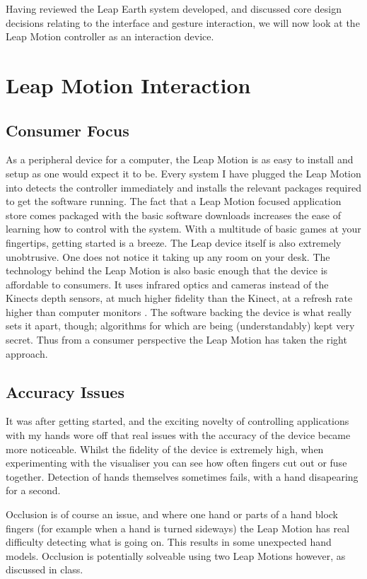 \documentclass{sigplanconf}
\begin{document}
Having reviewed the Leap Earth system developed, and discussed core design decisions relating to the interface and gesture interaction, we will now look at the Leap Motion controller as an interaction device.


\section{Leap Motion Interaction} 
\label{sec:leap_interaction}

\subsection{Consumer Focus}

As a peripheral device for a computer, the Leap Motion is as easy to install and setup as one would expect it to be. Every system I have plugged the Leap Motion into detects the controller immediately and installs the relevant packages required to get the software running. The fact that a Leap Motion focused application store comes packaged with the basic software downloads increases the ease of learning how to control with the system. With a multitude of basic games at your fingertips, getting started is a breeze. The Leap device itself is also extremely unobtrusive. One does not notice it taking up any room on your desk. The technology behind the Leap Motion is also basic enough that the device is affordable to consumers. It uses infrared optics and cameras instead of the Kinects depth sensors, at much higher fidelity than the Kinect, at a refresh rate higher than computer monitors \cite{}. The software backing the device is what really sets it apart, though; algorithms for which are being (understandably) kept very secret. Thus from a consumer perspective the Leap Motion has taken the right approach. 

\subsection{Accuracy Issues}

It was after getting started, and the exciting novelty of controlling applications with my hands wore off that real issues with the accuracy of the device became more noticeable. Whilst the fidelity of the device is extremely high, when experimenting with the visualiser you can see how often fingers cut out or fuse together. Detection of hands themselves sometimes fails, with a hand disapearing for a second. 

Occlusion is of course an issue, and where one hand or parts of a hand block fingers (for example when a hand is turned sideways) the Leap Motion has real difficulty detecting what is going on. This results in some unexpected hand models. Occlusion is potentially solveable using two Leap Motions however, as discussed in class.
\end{document}
